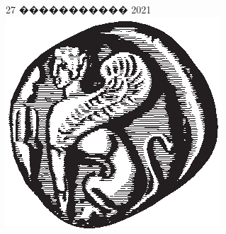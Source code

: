\documentclass[12pt, a4paper]{book}
\begin{document}
\begin{titlepage}


{\large 27 ����������� 2021}\\[2cm] %


\includegraphics{AegeanSimaBW.eps} \\[1cm]


\vfill %

\end{titlepage}
\pagestyle{empty}


\frontmatter
\pagestyle{fancy}
\tableofcontents
\listoftables
\listoffigures

\mainmatter


\pagestyle{fancy}

%
%
%


\nocite{*}


\end{document}
